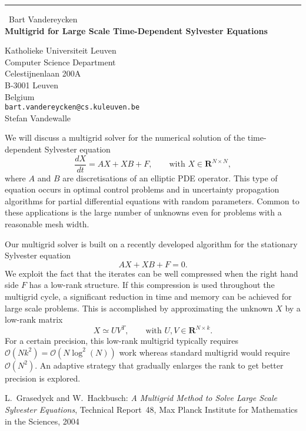 \documentclass{report}
\begin{document}
\begin{center}
\rule{6in}{1pt} \
{\large Bart Vandereycken \\
{\bf Multigrid for Large Scale Time-Dependent Sylvester Equations}}

Katholieke Universiteit Leuven \\ Computer Science Department \\ Celestijnenlaan 200A \\ B-3001 Leuven \\ Belgium
\\
{\tt bart.vandereycken@cs.kuleuven.be}\\
Stefan Vandewalle\end{center}

We will discuss a multigrid solver for the numerical solution of the
time-dependent Sylvester equation
\begin{equation*}
\frac{dX}{dt} = A X + X B + F, \qquad \text{with $X \in \mathbf{R}^{N\times N}$},
\end{equation*}
where $A$ and $B$ are discretisations of an elliptic PDE operator.
This type of equation occurs in optimal control problems and in uncertainty
propagation algorithms for partial differential equations with random
parameters. Common to these applications is the large number of unknowns
even for problems with a reasonable mesh width.

Our multigrid solver is built on a recently developed algorithm for the
stationary Sylvester equation \cite{GH}
\begin{equation*}
A X + X B + F = 0.
\end{equation*}
We exploit the fact that the iterates can be well compressed when the
right hand side $F$ has a low-rank structure. If this compression is used
throughout the multigrid cycle, a significant reduction in time and
memory can be achieved for large scale problems.
This is accomplished by approximating the unknown $X$ by a low-rank matrix
\begin{equation*}
X \simeq UV^T, \qquad \text{with $U, V \in \mathbf{R}^{N\times k}$}.
\end{equation*}
For a certain precision, this low-rank multigrid typically requires
$\mathcal{O}(Nk^2) = \mathcal{O}(N\log^2(N))$ work whereas standard
multigrid would require $\mathcal{O}(N^2)$. An adaptive strategy that
gradually enlarges the rank to get better precision is explored.

\begin{thebibliography}{9}
 L.~Grasedyck and W.~Hackbusch: \emph{A Multigrid Method to
Solve Large Scale Sylvester Equations}, Technical Report~48, Max Planck
Institute for Mathematics in the Sciences, 2004
\end{thebibliography}
\end{document}
